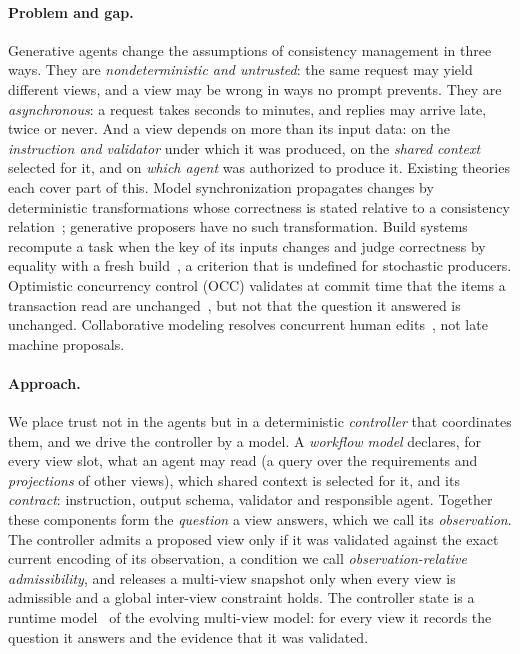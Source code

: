 \documentclass[pdflatex,sn-mathphys-num]{sn-jnl}
\theoremstyle{thmstyleone}%
\theoremstyle{thmstyletwo}%
\theoremstyle{thmstylethree}%
\begin{document}
\paragraph{Problem and gap.} Generative agents change the assumptions of consistency management in three ways. They are \emph{nondeterministic and untrusted}: the same request may yield different views, and a view may be wrong in ways no prompt prevents. They are \emph{asynchronous}: a request takes seconds to minutes, and replies may arrive late, twice or never. And a view depends on more than its input data: on the \emph{instruction and validator} under which it was produced, on the \emph{shared context} selected for it, and on \emph{which agent} was authorized to produce it. Existing theories each cover part of this. Model synchronization propagates changes by deterministic transformations whose correctness is stated relative to a consistency relation~\cite{hermann2015tgg}; generative proposers have no such transformation. Build systems recompute a task when the key of its inputs changes and judge correctness by equality with a fresh build~\cite{mokhov,mokhov2020jfp}, a criterion that is undefined for stochastic producers. Optimistic concurrency control (OCC) validates at commit time that the items a transaction read are unchanged~\cite{occ}, but not that the question it answered is unchanged. Collaborative modeling resolves concurrent human edits~\cite{franzago2018collaborative,david2023crdt}, not late machine proposals.

\paragraph{Approach.} We place trust not in the agents but in a deterministic \emph{controller} that coordinates them, and we drive the controller by a model. A \emph{workflow model} declares, for every view slot, what an agent may read (a query over the requirements and \emph{projections} of other views), which shared context is selected for it, and its \emph{contract}: instruction, output schema, validator and responsible agent. Together these components form the \emph{question} a view answers, which we call its \emph{observation}. The controller admits a proposed view only if it was validated against the exact current encoding of its observation, a condition we call \emph{observation-relative admissibility}, and releases a multi-view snapshot only when every view is admissible and a global inter-view constraint holds. The controller state is a runtime model~\cite{blair2009mrt,bencomo2019mrt} of the evolving multi-view model: for every view it records the question it answers and the evidence that it was validated.
\end{document}
